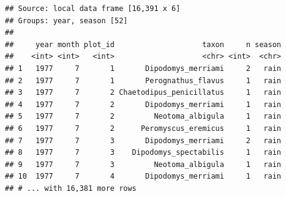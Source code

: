 \documentclass[]{article}
\newenvironment{Shaded}{\begin{snugshade}}{\end{snugshade}}
\newcommand{\KeywordTok}[1]{\textcolor[rgb]{0.13,0.29,0.53}{\textbf{{#1}}}}
\newcommand{\DecValTok}[1]{\textcolor[rgb]{0.00,0.00,0.81}{{#1}}}
\newcommand{\FloatTok}[1]{\textcolor[rgb]{0.00,0.00,0.81}{{#1}}}
\newcommand{\StringTok}[1]{\textcolor[rgb]{0.31,0.60,0.02}{{#1}}}
\newcommand{\OtherTok}[1]{\textcolor[rgb]{0.56,0.35,0.01}{{#1}}}
\newcommand{\NormalTok}[1]{{#1}}
\begin{document}
\begin{Shaded}
\end{Shaded}

\begin{verbatim}
## Source: local data frame [16,391 x 6]
## Groups: year, season [52]
## 
##     year month plot_id                    taxon     n season
##    <int> <int>   <int>                    <chr> <int>  <chr>
## 1   1977     7       1       Dipodomys_merriami     2   rain
## 2   1977     7       1       Perognathus_flavus     1   rain
## 3   1977     7       2 Chaetodipus_penicillatus     1   rain
## 4   1977     7       2       Dipodomys_merriami     1   rain
## 5   1977     7       2         Neotoma_albigula     1   rain
## 6   1977     7       2      Peromyscus_eremicus     1   rain
## 7   1977     7       3       Dipodomys_merriami     2   rain
## 8   1977     7       3    Dipodomys_spectabilis     1   rain
## 9   1977     7       3         Neotoma_albigula     1   rain
## 10  1977     7       4       Dipodomys_merriami     1   rain
## # ... with 16,381 more rows
\end{verbatim}
\end{document}
